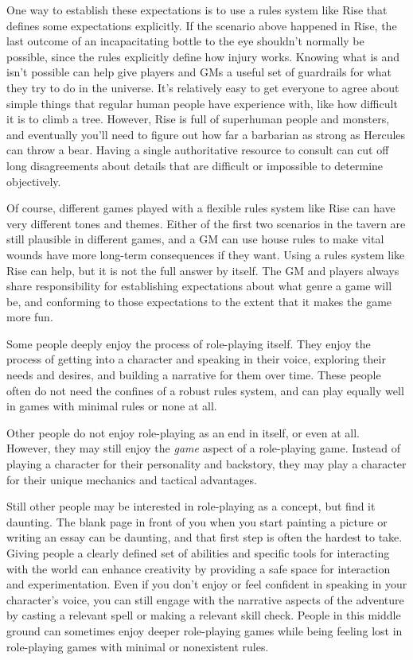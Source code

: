     One way to establish these expectations is to use a rules system like Rise that defines some expectations explicitly.
    If the scenario above happened in Rise, the last outcome of an incapacitating bottle to the eye shouldn't normally be possible, since the rules explicitly define how injury works.
    Knowing what is and isn't possible can help give players and GMs a useful set of guardrails for what they try to do in the universe.
    It's relatively easy to get everyone to agree about simple things that regular human people have experience with, like how difficult it is to climb a tree.
    However, Rise is full of superhuman people and monsters, and eventually you'll need to figure out how far a barbarian as strong as Hercules can throw a bear.
    Having a single authoritative resource to consult can cut off long disagreements about details that are difficult or impossible to determine objectively.

    Of course, different games played with a flexible rules system like Rise can have very different tones and themes.
    Either of the first two scenarios in the tavern are still plausible in different games, and a GM can use house rules to make vital wounds have more long-term consequences if they want.
    Using a rules system like Rise can help, but it is not the full answer by itself.
    The GM and players always share responsibility for establishing expectations about what genre a game will be, and conforming to those expectations to the extent that it makes the game more fun.

    Some people deeply enjoy the process of role-playing itself.
    They enjoy the process of getting into a character and speaking in their voice, exploring their needs and desires, and building a narrative for them over time.
    These people often do not need the confines of a robust rules system, and can play equally well in games with minimal rules or none at all.

    Other people do not enjoy role-playing as an end in itself, or even at all.
    However, they may still enjoy the \textit{game} aspect of a role-playing game.
    Instead of playing a character for their personality and backstory, they may play a character for their unique mechanics and tactical advantages.

    Still other people may be interested in role-playing as a concept, but find it daunting.
    The blank page in front of you when you start painting a picture or writing an essay can be daunting, and that first step is often the hardest to take.
    Giving people a clearly defined set of abilities and specific tools for interacting with the world can enhance creativity by providing a safe space for interaction and experimentation.
    Even if you don't enjoy or feel confident in speaking in your character's voice, you can still engage with the narrative aspects of the adventure by casting a relevant spell or making a relevant skill check.
    People in this middle ground can sometimes enjoy deeper role-playing games while being feeling lost in role-playing games with minimal or nonexistent rules.

